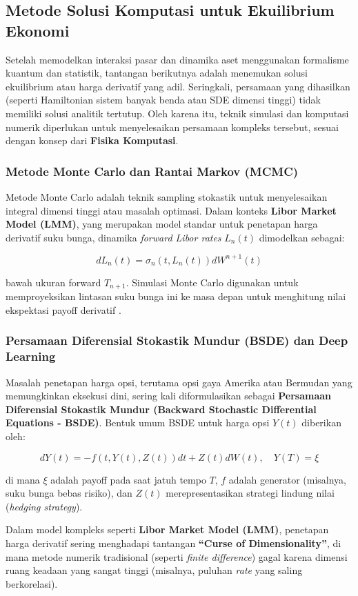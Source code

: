 \subsection{Metode Solusi Komputasi untuk Ekuilibrium Ekonomi}
Setelah memodelkan interaksi pasar dan dinamika aset menggunakan formalisme kuantum dan statistik, tantangan berikutnya adalah menemukan solusi ekuilibrium atau harga derivatif yang adil. Seringkali, persamaan yang dihasilkan (seperti Hamiltonian sistem banyak benda atau SDE dimensi tinggi) tidak memiliki solusi analitik tertutup. Oleh karena itu, teknik simulasi dan komputasi numerik diperlukan untuk menyelesaikan persamaan kompleks tersebut, sesuai dengan konsep dari \textbf{Fisika Komputasi}.

\subsubsection{Metode Monte Carlo dan Rantai Markov (MCMC)}
Metode Monte Carlo adalah teknik sampling stokastik untuk menyelesaikan integral dimensi tinggi atau masalah optimasi. Dalam konteks \textbf{Libor Market Model (LMM)}, yang merupakan model standar untuk penetapan harga derivatif suku bunga, dinamika \textit{forward Libor rates} $L_n(t)$ dimodelkan sebagai:

\[ dL_n(t) = \sigma_n(t, L_n(t)) dW^{n+1}(t) \]

bawah ukuran forward $T_{n+1}$. Simulasi Monte Carlo digunakan untuk memproyeksikan lintasan suku bunga ini ke masa depan untuk menghitung nilai ekspektasi payoff derivatif \citep{wang_deep_2018}.

\subsubsection{Persamaan Diferensial Stokastik Mundur (BSDE) dan Deep Learning}
Masalah penetapan harga opsi, terutama opsi gaya Amerika atau Bermudan yang memungkinkan eksekusi dini, sering kali diformulasikan sebagai \textbf{Persamaan Diferensial Stokastik Mundur (Backward Stochastic Differential Equations - BSDE)}. Bentuk umum BSDE untuk harga opsi $Y(t)$ diberikan oleh:

\[ dY(t) = -f(t, Y(t), Z(t)) dt + Z(t) dW(t), \quad Y(T) = \xi \]

di mana $\xi$ adalah payoff pada saat jatuh tempo $T$, $f$ adalah generator (misalnya, suku bunga bebas risiko), dan $Z(t)$ merepresentasikan strategi lindung nilai (\textit{hedging strategy}).

Dalam model kompleks seperti \textbf{Libor Market Model (LMM)}, penetapan harga derivatif sering menghadapi tantangan \textbf{``Curse of Dimensionality''}, di mana metode numerik tradisional (seperti \textit{finite difference}) gagal karena dimensi ruang keadaan yang sangat tinggi (misalnya, puluhan \textit{rate} yang saling berkorelasi).

